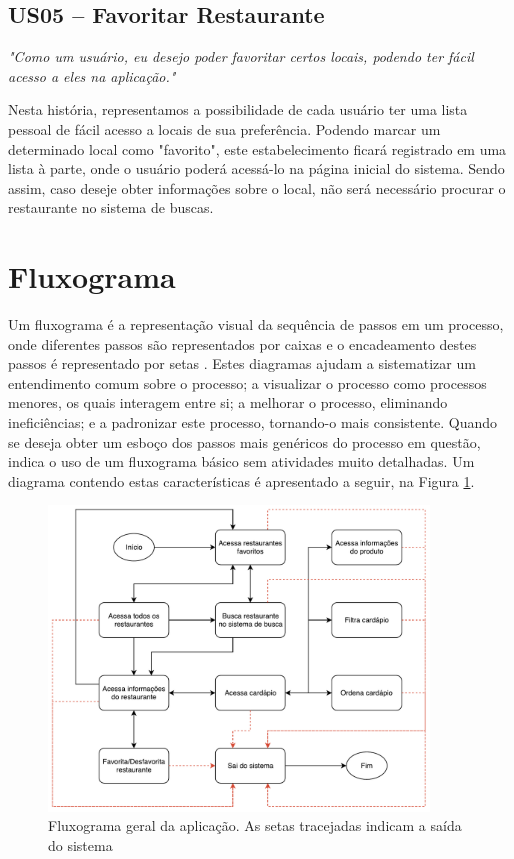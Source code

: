 \subsection{US05 -- Favoritar Restaurante}

\textit{"Como um usuário, eu desejo poder favoritar certos locais, podendo ter fácil acesso a eles na aplicação."}

Nesta história, representamos a possibilidade de cada usuário ter uma lista pessoal de fácil acesso a locais de sua preferência. Podendo marcar um determinado local como "favorito", este estabelecimento ficará registrado em uma lista à parte, onde o usuário poderá acessá-lo na página inicial do sistema. Sendo assim, caso deseje obter informações sobre o local, não será necessário procurar o restaurante no sistema de buscas.

\section{Fluxograma}
Um fluxograma é a representação visual da sequência de passos em um processo, onde diferentes passos são representados por caixas e o encadeamento destes passos é representado por setas \cite{REYNARD1995}. Estes diagramas ajudam a sistematizar um entendimento comum sobre o processo; a visualizar o processo como processos menores, os quais interagem entre si; a melhorar o processo, eliminando ineficiências; e a padronizar este processo, tornando-o mais consistente. Quando se deseja obter um esboço dos passos mais genéricos do processo em questão, \cite{REYNARD1995} indica o uso de um fluxograma básico sem atividades muito detalhadas. Um diagrama contendo estas características é apresentado a seguir, na Figura \ref{fig:fluxograma}.

\begin{figure}[H]
    \centering
    \caption[Fluxograma Geral do Sistema]{\label{fig:fluxograma}Fluxograma geral da aplicação. As setas tracejadas indicam a saída do sistema}
    \includegraphics[width=0.9\textwidth]{./pdf/fluxograma-atual.pdf}
\end{figure}


